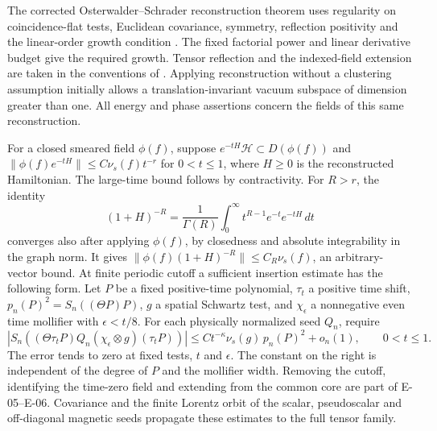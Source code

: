 \documentclass[11pt,letterpaper]{article}
\begin{document}
The corrected Osterwalder--Schrader reconstruction theorem uses regularity
on coincidence-flat tests, Euclidean covariance, symmetry, reflection
positivity and the linear-order growth condition \cite{OS2}. The fixed factorial power and linear derivative budget give the required growth. Tensor reflection and the indexed-field extension are taken in the conventions of \cite[\S6]{OS1}. Applying reconstruction without a clustering assumption initially
allows a translation-invariant vacuum subspace of dimension greater
than one. All energy and phase assertions concern the fields of this
same reconstruction.

For a closed smeared field \(\phi(f)\), suppose
\(e^{-tH}\mathcal H\subset D(\phi(f))\) and
\(\|\phi(f)e^{-tH}\|\le C\nu_s(f)t^{-r}\) for \(0<t\le1\),
where \(H\ge0\) is the reconstructed Hamiltonian. The large-time bound
follows by contractivity. For \(R>r\), the identity
\[
 (1+H)^{-R}=\frac{1}{\Gamma(R)}\int_0^\infty
                   t^{R-1}e^{-t} e^{-tH}\,dt
\]
converges also after applying \(\phi(f)\), by closedness and absolute
integrability in the graph norm. It gives
\(\|\phi(f)(1+H)^{-R}\|\le C_R\nu_s(f)\), an arbitrary-vector bound.
At finite periodic cutoff a sufficient insertion estimate has the
following form. Let \(P\) be a fixed positive-time polynomial, \(\tau_t\)
a positive time shift, \(p_n(P)^2=S_n((\Theta P)P)\), \(g\) a spatial
Schwartz test, and \(\chi_\epsilon\) a nonnegative even time mollifier
with \(\epsilon<t/8\). For each physically normalized seed \(Q_n\), require
\[
 \left|S_n\!\left((\Theta\tau_tP)
       Q_n(\chi_\epsilon\otimes g)(\tau_tP)\right)\right|
 \le C t^{-\kappa}\nu_s(g)\,p_n(P)^2+o_n(1),\qquad 0<t\le1 .
\]
The error tends to zero at fixed tests, \(t\) and \(\epsilon\). The
constant on the right is independent of the degree of \(P\) and the
mollifier width. Removing the cutoff, identifying the time-zero field
and extending from the common core are part of E-05--E-06. Covariance and the finite
Lorentz orbit of the scalar, pseudoscalar and off-diagonal magnetic
seeds propagate these estimates to the full tensor family.


\end{document}
